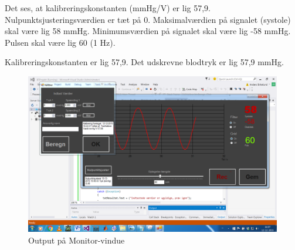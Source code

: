 Det ses, at kalibreringskonstanten (mmHg/V) er lig 57,9.
Nulpunktsjusteringsværdien er tæt på 0.
Maksimalværdien på signalet (systole) skal være lig 58 mmHg.
Minimumsværdien på signalet skal være lig -58 mmHg. 
Pulsen skal være lig 60 (1 Hz).

Kalibreringskonstanten er lig 57,9. Det udskrevne blodtryk er lig 57,9 mmHg.
\begin{figure}[H]
	\centering
	\includegraphics[width=1\textwidth]{Figurer/Test_Vis_2}
	\caption{Output på Monitor-vindue}
\end{figure}

